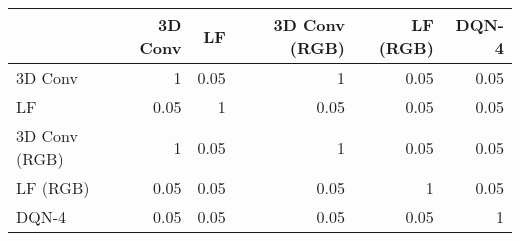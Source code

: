 \begin{tabular}{lrrrrr}
\hline
               &   3D Conv &   LF &   3D Conv (RGB) &   LF (RGB) &   DQN-4 \\
\hline
 3D Conv       &      1    & 0.05 &            1    &       0.05 &    0.05 \\
 LF            &      0.05 & 1    &            0.05 &       0.05 &    0.05 \\
 3D Conv (RGB) &      1    & 0.05 &            1    &       0.05 &    0.05 \\
 LF (RGB)      &      0.05 & 0.05 &            0.05 &       1    &    0.05 \\
 DQN-4         &      0.05 & 0.05 &            0.05 &       0.05 &    1    \\
\hline
\end{tabular}